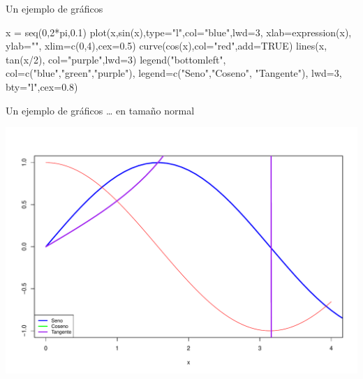 \documentclass[
  ignorenonframetext,
  aspectratio=169]{beamer}
\newenvironment{Shaded}{\begin{snugshade}}{\end{snugshade}}
\newcommand{\AttributeTok}[1]{\textcolor[rgb]{0.77,0.63,0.00}{#1}}
\newcommand{\ConstantTok}[1]{\textcolor[rgb]{0.00,0.00,0.00}{#1}}
\newcommand{\DecValTok}[1]{\textcolor[rgb]{0.00,0.00,0.81}{#1}}
\newcommand{\FloatTok}[1]{\textcolor[rgb]{0.00,0.00,0.81}{#1}}
\newcommand{\FunctionTok}[1]{\textcolor[rgb]{0.00,0.00,0.00}{#1}}
\newcommand{\NormalTok}[1]{#1}
\newcommand{\OtherTok}[1]{\textcolor[rgb]{0.56,0.35,0.01}{#1}}
\newcommand{\SpecialCharTok}[1]{\textcolor[rgb]{0.00,0.00,0.00}{#1}}
\newcommand{\StringTok}[1]{\textcolor[rgb]{0.31,0.60,0.02}{#1}}
\begin{document}
\begin{frame}[fragile]{Un ejemplo de gráficos}
\protect\hypertarget{un-ejemplo-de-gruxe1ficos}{}
\begin{Shaded}
\begin{Highlighting}[]
\NormalTok{x }\OtherTok{=} \FunctionTok{seq}\NormalTok{(}\DecValTok{0}\NormalTok{,}\DecValTok{2}\SpecialCharTok{*}\NormalTok{pi,}\FloatTok{0.1}\NormalTok{)}
\FunctionTok{plot}\NormalTok{(x,}\FunctionTok{sin}\NormalTok{(x),}\AttributeTok{type=}\StringTok{"l"}\NormalTok{,}\AttributeTok{col=}\StringTok{"blue"}\NormalTok{,}\AttributeTok{lwd=}\DecValTok{3}\NormalTok{, }
     \AttributeTok{xlab=}\FunctionTok{expression}\NormalTok{(x), }\AttributeTok{ylab=}\StringTok{""}\NormalTok{,}
     \AttributeTok{xlim=}\FunctionTok{c}\NormalTok{(}\DecValTok{0}\NormalTok{,}\DecValTok{4}\NormalTok{),}\AttributeTok{cex=}\FloatTok{0.5}\NormalTok{)}
\FunctionTok{curve}\NormalTok{(}\FunctionTok{cos}\NormalTok{(x),}\AttributeTok{col=}\StringTok{"red"}\NormalTok{,}\AttributeTok{add=}\ConstantTok{TRUE}\NormalTok{)}
\FunctionTok{lines}\NormalTok{(x, }\FunctionTok{tan}\NormalTok{(x}\SpecialCharTok{/}\DecValTok{2}\NormalTok{), }\AttributeTok{col=}\StringTok{"purple"}\NormalTok{,}\AttributeTok{lwd=}\DecValTok{3}\NormalTok{)}
\FunctionTok{legend}\NormalTok{(}\StringTok{"bottomleft"}\NormalTok{,}
       \AttributeTok{col=}\FunctionTok{c}\NormalTok{(}\StringTok{"blue"}\NormalTok{,}\StringTok{"green"}\NormalTok{,}\StringTok{"purple"}\NormalTok{),}
       \AttributeTok{legend=}\FunctionTok{c}\NormalTok{(}\StringTok{"Seno"}\NormalTok{,}\StringTok{"Coseno"}\NormalTok{, }\StringTok{"Tangente"}\NormalTok{),}
       \AttributeTok{lwd=}\DecValTok{3}\NormalTok{, }\AttributeTok{bty=}\StringTok{"l"}\NormalTok{,}\AttributeTok{cex=}\FloatTok{0.8}\NormalTok{)}
\end{Highlighting}
\end{Shaded}
\end{frame}

\begin{frame}{Un ejemplo de gráficos}
\protect\hypertarget{un-ejemplo-de-gruxe1ficos-1}{}
\ldots{} en tamaño normal

\begin{center}\includegraphics[width=0.6\linewidth]{Hora1_files/figure-beamer/plot2_tema1-1} \end{center}
\end{frame}
\end{document}
